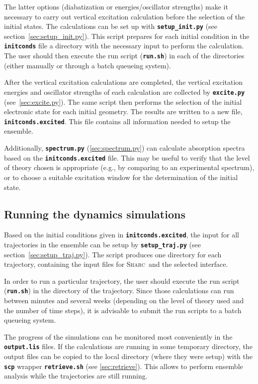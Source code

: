 \documentclass[a4paper,10pt,DIV=15,openany]{scrbook}
\newcommand{\sharc}{\textsc{Sharc}}
\newcommand{\ttt}[1]{\textbf{\texttt{#1}}}
\begin{document}
The latter options (diabatization or energies/oscillator strengths) make it necessary to carry out vertical excitation calculation before the selection of the initial states.
The calculations can be set up with \ttt{setup\_init.py} (see section~\ref{sec:setup_init.py}). This script prepares for each initial condition in the \ttt{initconds} file a directory with the necessary input to perform the calculation. The user should then execute the run script (\ttt{run.sh}) in each of the directories (either manually or through a batch queueing system).

After the vertical excitation calculations are completed, the vertical excitation energies and oscillator strengths of each calculation are collected by \ttt{excite.py} (see~\ref{sec:excite.py}). The same script then performs the selection of the initial electronic state for each initial geometry. The results are written to a new file, \ttt{initconds.excited}. This file contains all information needed to setup the ensemble. 

Additionally, \ttt{spectrum.py} (\ref{sec:spectrum.py}) can calculate absorption spectra based on the \ttt{initconds.excited} file. This may be useful to verify that the level of theory chosen is appropriate (e.g., by comparing to an experimental spectrum), or to choose a suitable excitation window for the determination of the initial state.

\subsection{Running the dynamics simulations}

Based on the initial conditions given in \ttt{initconds.excited}, the input for all trajectories in the ensemble can be setup by \ttt{setup\_traj.py} (see section~\ref{sec:setup_traj.py}). The script produces one directory for each trajectory, containing the input files for \sharc\ and the selected interface.

In order to run a particular trajectory, the user should execute the run script (\ttt{run.sh}) in the directory of the trajectory. Since those calculations can run between minutes and several weeks (depending on the level of theory used and the number of time steps), it is advisable to submit the run scripts to a batch queueing system. 

The progress of the simulations can be monitored most conveniently in the \ttt{output.lis} files. If the calculations are running in some temporary directory, the output files can be copied to the local directory (where they were setup) with the \ttt{scp} wrapper \ttt{retrieve.sh} (see \ref{sec:retrieve}). This allows to perform ensemble analysis while the trajectories are still running.
\end{document}
